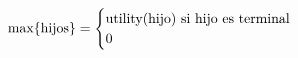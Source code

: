 \documentclass[preview]{standalone}
\begin{document}
\begin{align*}
\text{max\{hijos\}} =  \begin{cases}\text{utility(hijo) si hijo es terminal} \cr
                                 0 \cr
                                 \end{cases}
\end{align*}
\end{document}
